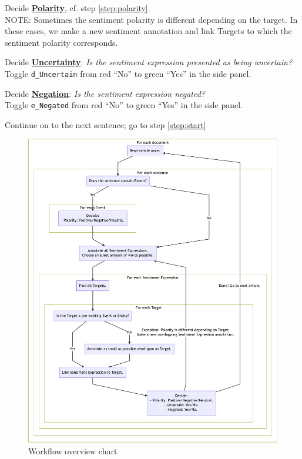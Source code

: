 \begin{steps}[leftmargin=*]
        \item Decide \hyperlink{sec:polaritydefinition}{\textbf{Polarity}}, cf. step \ref{step:polarity}.\\
        \textcolor{BrickRed}{NOTE: Sometimes the sentiment polarity is different depending on the target. In these cases, we make a new sentiment annotation and link Targets to which the sentiment polarity corresponds.}
        
        \item Decide \hyperlink{sec:uncertaintydefinition}{\textbf{Uncertainty}}: \textit{Is the sentiment expression presented as being uncertain?}\\
        \textcolor{OliveGreen}{
        Toggle \texttt{d\_Uncertain} from red ``No'' to green ``Yes'' in the side panel.
        }
        
        \item Decide \hyperlink{sec:negationdefinition}\textbf{Negation}: \textit{Is the sentiment expression negated?}\\
        \textcolor{OliveGreen}{
        Toggle \texttt{e\_Negated} from red ``No'' to green ``Yes'' in the side panel.
        }
        
    \item Continue on to the next sentence; go to step \ref{step:start}
    
\end{steps}

\begin{figure}[!htb]
    \centering
    \caption*{Workflow overview chart}
    \includegraphics[width=\textwidth]{img/workflow-diagram-cropped.pdf}
\end{figure}